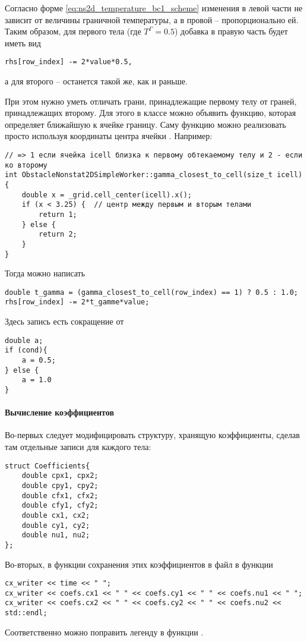 Согласно форме
\cref{eq:ns2d_temperature_bc1_scheme}
изменения в левой части не зависит от величины граничной температуры,
а в провой -- пропорционально ей.
Таким образом, для первого тела (где $T^\Gamma = 0.5$) добавка в правую часть будет иметь вид
\begin{verbatim}
rhs[row_index] -= 2*value*0.5,
\end{verbatim}
а для второго -- останется такой же, как и раньше.

При этом нужно уметь отличать грани, принадлежащие
первому телу от граней, принадлежащих второму.
Для этого в классе  можно
объявить функцию, которая определяет ближайшую к ячейке границу.
Саму функцию можно реализовать просто используя координаты
центра ячейки . Например:
\begin{verbatim}
// => 1 если ячейка icell близка к первому обтекаемому телу и 2 - если ко второму
int ObstacleNonstat2DSimpleWorker::gamma_closest_to_cell(size_t icell){
	double x = _grid.cell_center(icell).x();
	if (x < 3.25) {  // центр между первым и вторым телами
		return 1;
	} else {
		return 2;
	}
}
\end{verbatim}
Тогда можно написать
\begin{verbatim}
double t_gamma = (gamma_closest_to_cell(row_index) == 1) ? 0.5 : 1.0;
rhs[row_index] -= 2*t_gamme*value;
\end{verbatim}
Здесь запись  есть сокращение от

\begin{verbatim}
double a;
if (cond){
	a = 0.5;
} else {
	a = 1.0
}
\end{verbatim}

\paragraph{Вычисление коэффициентов}
Во-первых следует модифицировать структуру, хранящую коэффициенты,
сделав там отдельные записи для каждого тела:
\begin{verbatim}
struct Coefficients{
	double cpx1, cpx2;
	double cpy1, cpy2;
	double cfx1, cfx2;
	double cfy1, cfy2;
	double cx1, cx2;
	double cy1, cy2;
	double nu1, nu2;
};
\end{verbatim}
Во-вторых, в функции сохранения этих коэффициентов в файл
в функции 
\begin{verbatim}
cx_writer << time << " ";
cx_writer << coefs.cx1 << " " << coefs.cy1 << " " << coefs.nu1 << " ";
cx_writer << coefs.cx2 << " " << coefs.cy2 << " " << coefs.nu2 << std::endl;
\end{verbatim}
Соответственно можно поправить легенду в функции .

